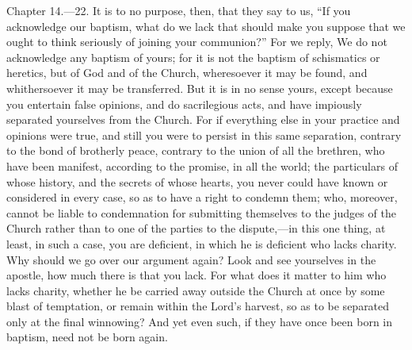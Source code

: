 Chapter 14.—22. It is to no purpose, then, that they say to us, ``If you acknowledge our baptism, what do we lack that should make you suppose that we ought to think seriously of joining your communion?'' For we reply, We do not acknowledge any baptism of yours; for it is not the baptism of schismatics or heretics, but of God and of the Church, wheresoever it may be found, and whithersoever it may be transferred. But it is in no sense yours, except because you entertain false opinions, and do sacrilegious acts, and have impiously separated yourselves from the Church. For if everything else in your practice and opinions were true, and still you were to persist in this same separation, contrary to the bond of brotherly peace, contrary to the union of all the brethren, who have been manifest, according to the promise, in all the world; the particulars of whose history, and the secrets of whose hearts, you never could have known or considered in every case, so as to have a right to condemn them; who, moreover, cannot be liable to condemnation for submitting themselves to the judges of the Church rather than to one of the parties to the dispute,—in this one thing, at least, in such a case, you are deficient, in which he is deficient who lacks charity. Why should we go over our argument again? Look and see yourselves in the apostle, how much there is that you lack. For what does it matter to him who lacks charity, whether he be carried away outside the Church at once by some blast of temptation, or remain within the Lord’s harvest, so as to be separated only at the final winnowing? And yet even such, if they have once been born in baptism, need not be born again.


